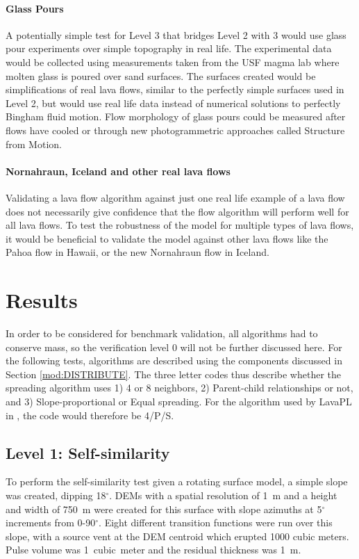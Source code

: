 \documentclass[12pt,letter]{article}
\begin{document}
		\paragraph{Glass Pours}
			A potentially simple test for Level 3 that bridges Level 2 with 3 would use glass pour experiments over simple topography in real life. The experimental data would be collected using measurements taken from the USF magma lab where molten glass is poured over sand surfaces. The surfaces created would be simplifications of real lava flows, similar to the perfectly simple surfaces used in Level 2, but would use real life data instead of numerical solutions to perfectly Bingham fluid motion. Flow morphology of glass pours could be measured after flows have cooled or through new photogrammetric approaches called Structure from Motion.
			
		\paragraph{Nornahraun, Iceland and other real lava flows}
			Validating a lava flow algorithm against just one real life example of a lava flow does not necessarily give confidence that the flow algorithm will perform well for all lava flows. To test the robustness of the model for multiple types of lava flows, it would be beneficial to validate the model against other lava flows like the Pahoa flow in Hawaii, or the new Nornahraun flow in Iceland.
			
		


\section{Results}\label{sec:BMResults}
	
	In order to be considered for benchmark validation, all algorithms had to conserve mass, so the verification level 0 will not be further discussed here. For the following tests, algorithms are described using the components discussed in Section \ref{mod:DISTRIBUTE}. The three letter codes thus describe whether the spreading algorithm uses 1) 4 or 8 neighbors, 2) Parent-child relationships or not, and 3) Slope-proportional or Equal spreading. For the algorithm used by LavaPL in \citet{connor2012}, the code would therefore be 4/P/S.

	\subsection{Level 1: Self-similarity}
	To perform the self-similarity test given a rotating surface model, a simple slope was created, dipping 18$^{\circ}$. DEMs with a spatial resolution of 1~m and a height and width of 750~m were created for this surface with slope azimuths at 5$^{\circ}$ increments from 0-90$^{\circ}$. Eight different transition functions were run over this slope, with a source vent at the DEM centroid which erupted 1000 cubic meters. Pulse volume was 1~cubic~meter and the residual thickness was 1~m.
	
\end{document}
